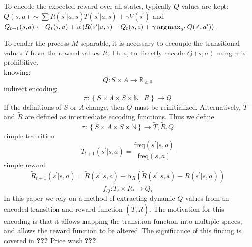 To encode the expected reward over all states, typically $Q$-values are kept: $ Q(s,a) \sim \sum R(s^\prime|a,s)T(s^\prime|a,s)+\gamma V(s^\prime) $ and $ Q_{t+1}(s,a) \leftarrow Q_t(s,a)+\alpha \left( R(s^\prime|a,s)-Q_t(s,a)+\gamma\operatorname*{arg\,max}_{a^\prime} Q(s^\prime,a^\prime) \right) $.

To render the process $M$ separable, it is necessary to decouple the transitional values $T$ from the reward values $R$. Thus, to directly encode $Q(s,a)$ using $\pi$ is prohibitive.\\
knowing: 
\begin{equation*}
Q: S \times A \to \mathbb{R}_{\geq 0}
\end{equation*}
indirect encoding:
\begin{equation*}
\pi: \left\{ S \times A \times S \times \mathbb{N} \middle| R \right\} \to Q
\end{equation*}
If the definitions of $S$ or $A$ change, then $Q$ must be reinitialized. Alternatively, $\tilde{T}$ and $\tilde{R}$ are defined as intermediate encoding functions. Thus we define
\begin{equation*}
\pi:\left\{S \times A \times S \times \mathbb{N}\right\} \to \tilde{T}, \tilde{R}, Q
\end{equation*} 
simple transition
\begin{equation*}
\tilde{T}_{t+1}(s^\prime|s,a) = \frac{\textrm{freq}(s^\prime|s,a)}{\textrm{freq}(s,a)}
\end{equation*}
simple reward
\begin{equation*}
\tilde{R}_{t+1}(s^\prime|s,a) = \tilde{R}(s^\prime|s,a)+\alpha_R\left( \tilde{R}(s^\prime|s,a)-R(s^\prime|s,a)\right)
\end{equation*}
\begin{equation*}
f_Q: \tilde{T}_t \times \tilde{R}_t \to Q_t
\end{equation*}
In this paper we rely on a method of extracting dynamic $Q$-values from an encoded transition and reward function $( \tilde{T}, \tilde{R} )$. The motivation for this encoding is that it allows mapping the transition function into multiple spaces, and allows the reward function to be altered. The significance of this finding is covered in \textbf{???} Price wash \textbf{???}.

 
